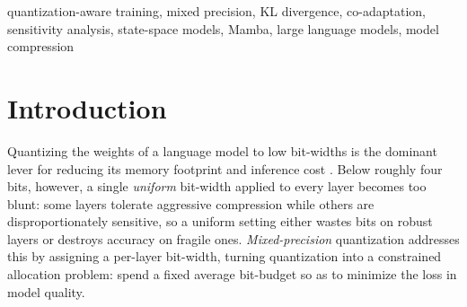 \documentclass[conference]{IEEEtran}
\begin{document}
\begin{abstract}
Mixed-precision quantization assigns a per-layer bit-width and is the standard
route to sub-4-bit inference, where a single uniform width is too coarse. The
common recipe is \emph{post-hoc}: measure each layer's sensitivity on a fixed
trained model, freeze the assignment, and briefly fine-tune. This is simple and
effective when the budget is generous, but the assignment is made against weights
that never see the final precision, so the model cannot \emph{co-adapt} to it. This
work asks whether moving the sensitivity signal, a per-layer marginal
Kullback--Leibler (KL) divergence between the quantized and full-precision
predictive distributions, inside the training loop helps when the budget is
tightest. The proposed controller anneals the average bit-width to a target and continually
re-allocates precision while the weights are still learning. On Mamba-130M with
WikiText, this co-adaptive allocation beats a post-hoc allocator using the \emph{same}
KL signal in the aggressive sub-4-bit regime (314 vs.\ 950 perplexity at a 3-bit
average, a budget no uniform width can reach), and the advantage transfers to a
transformer (GPT-2: 56.4 vs.\ 145.1). The gain is specific to this regime: once a
uniform width can reach the budget it is simpler and Pareto-dominates all
mixed-precision methods, so co-adaptation helps precisely where a sub-4-bit average
must be hit and uniform quantization is not an option. Realizing it also requires
co-designing the precision anneal with the learning rate, which is held through
co-adaptation rather than decayed to zero. At these tight budgets co-adaptation,
not allocation, is the operative degree of freedom.
\end{abstract}

\begin{IEEEkeywords}
quantization-aware training, mixed precision, KL divergence, co-adaptation,
sensitivity analysis, state-space models, Mamba, large language models,
model compression
\end{IEEEkeywords}

\section{Introduction}
Quantizing the weights of a language model to low bit-widths is the dominant
lever for reducing its memory footprint and inference cost \cite{survey}. Below roughly four
bits, however, a single \emph{uniform} bit-width applied to every layer becomes
too blunt: some layers tolerate aggressive compression while others are
disproportionately sensitive, so a uniform setting either wastes bits on robust
layers or destroys accuracy on fragile ones. \emph{Mixed-precision}
quantization addresses this by assigning a per-layer bit-width, turning
quantization into a constrained allocation problem: spend a fixed average
bit-budget so as to minimize the loss in model quality.
\end{document}
